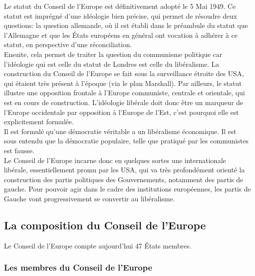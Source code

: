 \documentclass[10pt, a4paper, openany]{book}
\begin{document}
Le statut du Conseil de l'Europe est définitivement adopté le 5 Mai 1949. Ce statut est imprégné d'une idéologie bien précise, qui permet de résoudre deux questions: la question allemande, où il est établi dans le préambule du statut que l'Allemagne et que les États européens en général ont vocation à adhérer à ce statut, en perspective d'une réconciliation. \\
Ensuite, cela permet de traiter la question du communisme politique car l'idéologie qui est celle du statut de Londres est celle du libéralisme. La construction du Conseil de l'Europe se fait sous la surveillance étroite des USA, qui étaient très présent à l'époque (via le plan Marshall). Par ailleurs, le statut illustre une opposition frontale à l'Europe communiste, centrale et orientale, qui est en cours de construction. L'idéologie libérale doit donc être un marqueur de l'Europe occidentale par opposition à l'Europe de l'Est, c'est pourquoi elle est explicitement formulée. \\
Il est formulé qu'une démocratie véritable a un libéralisme économique. Il est sous entendu que la démocratie populaire, telle que pratiqué par les communistes est fausse. \\
Le Conseil de l'Europe incarne donc en quelques sortes une internationale libérale, essentiellement promu par les USA, qui va très profondément orienté la construction des partis politiques des Gouvernements, notamment des partis de gauche. Pour pouvoir agir dans le cadre des institutions européennes, les partis de Gauche vont progressivement se convertir au libéralisme. 

\subsection{La composition du Conseil de l'Europe}

Le Conseil de l'Europe compte aujourd'hui 47 États membres. 

\subsubsection{Les membres du Conseil de l'Europe}
\end{document}
